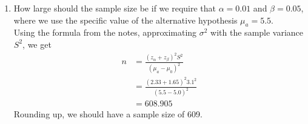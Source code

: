 \documentclass[12pt]{article}
\begin{document}
\begin{enumerate}
\begin{enumerate}
\item How large should the sample size be if we require that $\alpha = 0.01$ and $\beta = 0.05$, where we use the specific value of the alternative hypothesis $\mu_a = 5.5$.\\

Using the formula from the notes, approximating $\sigma^2$ with the sample variance $S^2$, we get
\begin{align*}
n &= \frac{(z_\alpha + z_\beta)^2 S^2}{(\mu_a - \mu_0)^2 }\\
&= \frac{(2.33 + 1.65)^2  3.1^2}{(5.5 - 5.0)^2 }\\
&= 608.905
\end{align*}
Rounding up, we should have a sample size of 609.
\end{enumerate}


\end{enumerate}
\end{document}
